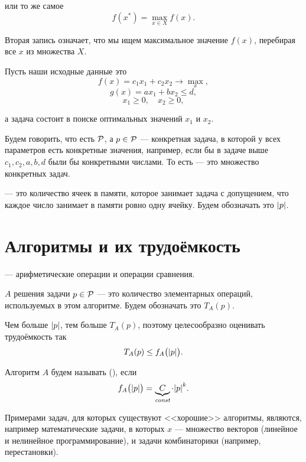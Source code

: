 или то же самое
\[f(x^*) = \max_{x \in X} f(x).\]

Вторая запись означает, что мы ищем максимальное значение $f(x)$, перебирая все $x$ из множества $X$.

\example

Пусть наши исходные данные это
\[f(x) = c_1 x_1 + c_2 x_2 \to \max_x,\]
\[g(x) = ax_1 + bx_2 \le d,\]
\[x_1 \ge 0, \quad x_2 \ge 0,\]

а задача состоит в поиске оптимальных значений $x_1$ и $x_2$.


Будем говорить, что есть  $\P$, а $p \in \P$ --- конкретная задача, в которой у всех параметров есть конкретные значения, например, если бы в задаче выше $c_1, c_2, a, b, d$ были бы конкретными числами. То есть  --- это множество конкретных задач.


 --- это количество ячеек в памяти, которое занимает задача с допущением, что каждое число занимает в памяти ровно одну ячейку. Будем обозначать это $\problemlength{p}$.

\section{Алгоритмы и их трудоёмкость}


 --- арифметические операции и операции сравнения.


 $A$ решения задачи $p \in \P$ --- это количество элементарных операций, используемых в этом алгоритме. Будем обозначать это $T_A(p)$.

\remark

Чем больше $\problemlength{p}$, тем больше $T_A(p)$, поэтому целесообразно оценивать трудоёмкость так
\[T_A(p) \le f_A\big(\problemlength{p}\big).\]


Алгоритм $A$ будем называть  (), если
\[
f_A\big(\problemlength{p}\big) = \underbrace{C}_{\const} \cdot \problemlength{p}^k.
\]

\begin{note}
Примерами задач, для которых существуют <<хорошие>> алгоритмы, являются, например математические задачи, в которых $x$ --- множество векторов (линейное и нелинейное программирование), и задачи комбинаторики (например, перестановки).
\end{note}

